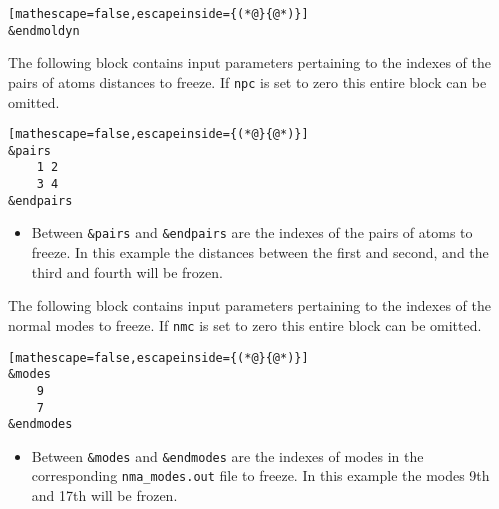 \begin{lstlisting}[mathescape=false,escapeinside={(*@}{@*)}]
&endmoldyn

\end{lstlisting}

The following block contains input parameters pertaining to the indexes of the pairs of atoms distances to freeze. If \verb+npc+ is set to zero this entire block can be omitted.
\begin{lstlisting}[mathescape=false,escapeinside={(*@}{@*)}]
&pairs
    1 2
    3 4
&endpairs
\end{lstlisting}
\begin{itemize}
\item Between \verb+&pairs+ and \verb+&endpairs+ are the indexes of the pairs of atoms to freeze. In this example the distances between the first and second, and the third and fourth will be frozen.
\end{itemize}

The following block contains input parameters pertaining to the indexes of the normal modes to freeze. If \verb+nmc+ is set to zero this entire block can be omitted.
\begin{lstlisting}[mathescape=false,escapeinside={(*@}{@*)}]
&modes
    9
    7
&endmodes
\end{lstlisting}
\begin{itemize}
\item Between \verb+&modes+ and \verb+&endmodes+ are the indexes of modes in the corresponding \verb+nma_modes.out+ file to freeze. In this example the modes 9th and 17th will be frozen.
\end{itemize}

